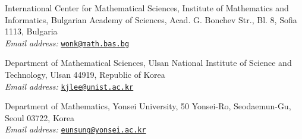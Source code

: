 \documentclass{article}
\theoremstyle{remark}
\begin{document}
\printbibliography


\vspace{1cm}

International Center for Mathematical Sciences, Institute of Mathematics and Informatics, Bulgarian Academy of Sciences, Acad. G. Bonchev Str., Bl. 8, Sofia 1113, Bulgaria
\\
\textit{Email address: }\href{mailto:wonk@math.bas.bg}{\texttt{wonk@math.bas.bg}}\newline

Department of Mathematical Sciences, Ulsan National Institute of Science and Technology, Ulsan 44919, Republic of Korea\\
\textit{Email address: }\href{mailto:kjlee@unist.ac.kr}{\texttt{kjlee@unist.ac.kr}}\newline

Department of Mathematics, Yonsei University, 50 Yonsei-Ro, Seodaemun-Gu, Seoul 03722, Korea\\
\textit{Email address: }\href{mailto:eunsung@yonsei.ac.kr}{\texttt{eunsung@yonsei.ac.kr}}\newline
\end{document}
